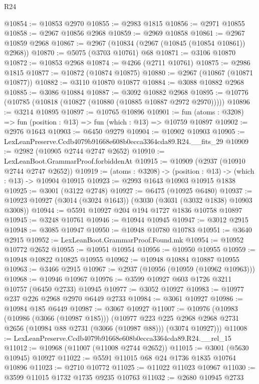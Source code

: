\begin{lexlean}{R24}
\begin{coremodule}
@10854 := @10853 @2970
@10855 := @2983 @1815
@10856 := @2971 @10855
@10858 := @2967 @10856 @2968
@10859 := @2969 @10858
@10861 := @2967 @10859 @2968
@10867 := @2967 (@10834 (@2967 (@10845 (@10854 @10861)) @2968))
@10870 := @5075 (@3703 @10761) @68
@10871 := @3106 @10870
@10872 := @10853 @2968
@10874 := @4266 (@2711 @10761)
@10875 := @2986 @1815
@10877 := @10872 (@10874 @10875)
@10880 := @2967 (@10867 (@10871 @10877))
@10882 := @3110 @10870 @10877
@10884 := @3088 @10882 @2968
@10885 := @3086 @10884
@10887 := @3092 @10882 @2968
@10895 := @10776 (@10785 (@10818 (@10827 (@10880 (@10885 @10887 @2972 @2970)))))
@10896 := @3214 @10895
@10897 := @10765 @10896
@10901 := fun (atoms : @3208) => fun (position : @13) => fun (which : @13) => @10759 @10897
@10902 := @2976 @1643
@10903 := @6450 @9279
@10904 := @10902 @10903
@10905 := LexLeanPreserve.Ccdb4079b91668e608b0ecca3364cda89.R24.__fits_29
@10909 := @2982 (@10905 @2744 @2747 @2652)
@10910 := LexLeanBoot.GrammarProof.forbiddenAt
@10915 := @10909 (@2937 (@10910 @2744 @2747 @2652))
@10919 := (atoms : @3208) -> (position : @13) -> (which : @13) -> @10904 @10915
@10923 := @2993 @1643 @10903 @10915 @1838
@10925 := @3001 (@3122 @2748)
@10927 := @6475 (@10925 @6480)
@10937 := @10923 @10927 (@3014 (@3024 @1643)) (@3030 (@3031 (@3032 @1838) @10903 @3008))
@10944 := @5591 @10927 @204 @194 @1727 @1836 @10758 @10897
@10945 := @3248 @10761
@10946 := @10944 @10945
@10947 := @3012 @2915
@10948 := @3085 @10947
@10950 := @10948 @10780 @10783
@10951 := @3640 @2915
@10952 := LexLeanBoot.GrammarProof.Found.mk
@10954 := @10952 @10772 @2652
@10955 := @10951 @10954
@10956 := @10950 @10955
@10959 := @10948 @10822 @10825 @10955
@10962 := @10948 @10884 @10887 @10955
@10963 := @3466 @2915
@10967 := @2937 (@10956 (@10959 (@10962 @10963)))
@10968 := @10946 @10967
@10976 := @3599 @10927 @603 @1726 @3211 @10757 (@6450 @2733) @10945
@10977 := @3052 @10927
@10983 := @10977 @237 @226 @2968 @2970 @6449 @2733
@10984 := @3061 @10927
@10986 := @10984 @185 @6449
@10987 := @3067 @10927
@11007 := @10976
    (@10983
      (@10986 (@3066 (@10987 @185)))
      (@10977
        @223
        @225
        @2968
        @2968
        @2731
        @2656
        (@10984 @88 @2731 (@3066 (@10987 @88)))
        (@3074 @10927)))
@11008 := LexLeanPreserve.Ccdb4079b91668e608b0ecca3364cda89.R24.__rel_15
@11012 := @10968 (@11007 (@11008 @2744 @2652))
@11015 := @3001 (@5630 @10945) @10927
@11022 := @5591 @11015 @68 @24 @1736 @1835 @10764 @10896
@11023 := @2710 @10772
@11025 := @11022 @11023 @10967
@11030 := @3599 @11015 @1732 @1735 @9235 @10763
@11032 := @2680 @10945 @2733

\end{coremodule}
\end{lexlean}
